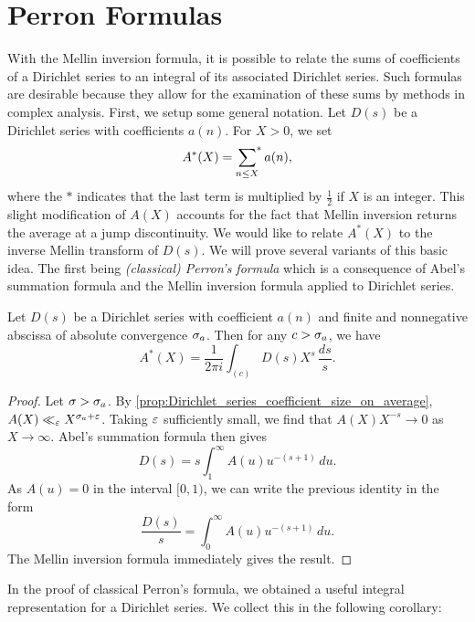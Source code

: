 \documentclass[12pt]{article}
\begin{document}
  \section{Perron Formulas}
    With the Mellin inversion formula, it is possible to relate the sums of coefficients of a Dirichlet series to an integral of its associated Dirichlet series. Such formulas are desirable because they allow for the examination of these sums by methods in complex analysis. First, we setup some general notation. Let \(D(s)\) be a Dirichlet series with coefficients \(a(n)\). For \(X > 0\), we set
    \[
      A^{\ast}(X) = \sideset{}{^{\ast}}\sum_{n \le X}a(n),
    \]
    where the \(\ast\) indicates that the last term is multiplied by \(\frac{1}{2}\) if \(X\) is an integer. This slight modification of \(A(X)\) accounts for the fact that Mellin inversion returns the average at a jump discontinuity. We would like to relate \(A^{\ast}(X)\) to the inverse Mellin transform of \(D(s)\). We will prove several variants of this basic idea. The first being \textit{(classical) Perron's formula} which is a consequence of Abel's summation formula and the Mellin inversion formula applied to Dirichlet series.

    \begin{theorem*}
      Let \(D(s)\) be a Dirichlet series with coefficient \(a(n)\) and finite and nonnegative abscissa of absolute convergence \(\sigma_{a}\). Then for any \(c > \sigma_{a}\), we have
      \[
        A^{\ast}(X) = \frac{1}{2\pi i}\int_{(c)}D(s)X^{s}\,\frac{ds}{s}.
      \]
    \end{theorem*}
    \begin{proof}
      Let \(\sigma > \sigma_{a}\). By \cref{prop:Dirichlet_series_coefficient_size_on_average}, \(A(X) \ll_{\varepsilon} X^{\sigma_{a}+\varepsilon}\). Taking \(\varepsilon\) sufficiently small, we find that \(A(X)X^{-s} \to 0\) as \(X \to \infty\). Abel's summation formula then gives
      \begin{equation}\label{equ:integral_rep_for_Dirichlet_series}
        D(s) = s\int_{1}^{\infty}A(u)u^{-(s+1)}\,du.
      \end{equation}
      As \(A(u) = 0\) in the interval \([0,1)\), we can write the previous identity in the form
      \[
        \frac{D(s)}{s} = \int_{0}^{\infty}A(u)u^{-(s+1)}\,du.
      \]
      The Mellin inversion formula immediately gives the result.
    \end{proof}

    In the proof of classical Perron's formula, we obtained a useful integral representation for a Dirichlet series. We collect this in the following corollary:
\end{document}
